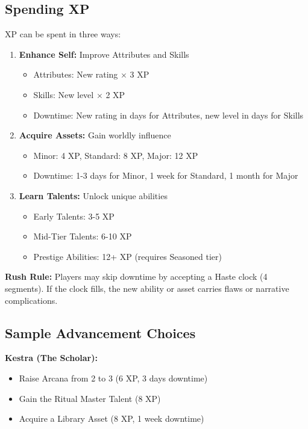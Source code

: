 \documentclass[11pt]{article}
\begin{document}
\subsection{Spending XP}

XP can be spent in three ways:
\begin{enumerate}
\item \textbf{Enhance Self:} Improve Attributes and Skills
   \begin{itemize}
   \item Attributes: New rating $\times$ 3 XP
   \item Skills: New level $\times$ 2 XP
   \item Downtime: New rating in days for Attributes, new level in days for Skills
   \end{itemize}
\item \textbf{Acquire Assets:} Gain worldly influence
   \begin{itemize}
   \item Minor: 4 XP, Standard: 8 XP, Major: 12 XP
   \item Downtime: 1-3 days for Minor, 1 week for Standard, 1 month for Major
   \end{itemize}
\item \textbf{Learn Talents:} Unlock unique abilities
   \begin{itemize}
   \item Early Talents: 3-5 XP
   \item Mid-Tier Talents: 6-10 XP
   \item Prestige Abilities: 12+ XP (requires Seasoned tier)
   \end{itemize}
\end{enumerate}

\textbf{Rush Rule:} Players may skip downtime by accepting a Haste clock (4 segments). If the clock fills, the new ability or asset carries flaws or narrative complications.

\subsection{Sample Advancement Choices}

\textbf{Kestra (The Scholar):}
\begin{itemize}
\item Raise Arcana from 2 to 3 (6 XP, 3 days downtime)
\item Gain the Ritual Master Talent (8 XP)
\item Acquire a Library Asset (8 XP, 1 week downtime)
\end{itemize}
\end{document}
